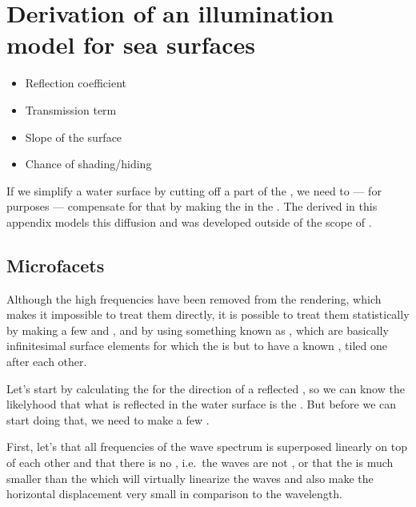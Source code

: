 \chapter{Derivation of an illumination model for sea surfaces}
\label{chap:illumination_model_derivation}

\begin{itemize}
\item Reflection coefficient
\item Transmission term
\item Slope of the surface
\item Chance of shading/hiding
\end{itemize}

\HRule

{
If we simplify a water surface by cutting off a part of the , we need to --- for \rendering purposes --- compensate for that by making the  in the  . The  derived in this appendix models this diffusion and was developed outside of the scope of \thismasterthesiswork.

\section{Microfacets}

Although the high frequencies have been removed from the rendering, which makes it impossible to treat them directly, it is possible to treat them statistically by making a few \assumptions and \approximations, and by using something known as \microfacets, which are basically infinitesimal surface elements for which the  is \stochastic but \assumed to have a known , tiled one after each other.

Let's start by calculating the  for the direction of a reflected \ray, so we can know the likelyhood that what is reflected in the water surface is the \sun. But before we can start doing that, we need to make a few \assumptions.

First, let's \assume that all frequencies of the wave spectrum is superposed linearly on top of each other and that there is no , i.e.\ the waves are not , or that the  is much smaller than the \wavelength which will virtually linearize the waves and also make the horizontal displacement very small in comparison to the wavelength.

}

